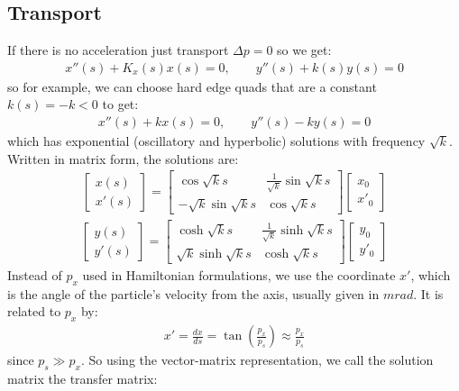 \documentclass{article}
\numberwithin{equation}{section}
\begin{document}
\subsection{ Transport }
If there is no acceleration just transport $\Delta p = 0$ so we get:
\begin{align}
x''(s) + K_x(s) x(s) = 0 , \qquad
y''(s) + k(s) y(s) = 0
\end{align}
so for example, we can choose hard edge quads that are a constant $k(s) = -k < 0$ to get: 
\begin{align}
x''(s) + k x(s) = 0 , \qquad
y''(s) - k y(s) = 0
\end{align}
which has exponential (oscillatory and hyperbolic) solutions with frequency $\sqrt{k}$. Written in matrix form, the solutions are:
\begin{align}
\begin{bmatrix} x(s) \\ x'(s) \end{bmatrix} =
\begin{bmatrix} \cos \sqrt{k}s & \frac{1}{\sqrt{k}} \sin \sqrt{k}s \\
-\sqrt{k} \sin \sqrt{k}s & \cos \sqrt{k}s \end{bmatrix}
\begin{bmatrix} x_0 \\ x'_0 \end{bmatrix}
\end{align}
\begin{align}
\begin{bmatrix} y(s) \\ y'(s) \end{bmatrix} =
\begin{bmatrix} \cosh \sqrt{k}s & \frac{1}{\sqrt{k}} \sinh \sqrt{k}s \\
\sqrt{k} \sinh \sqrt{k}s & \cosh \sqrt{k}s \end{bmatrix}
\begin{bmatrix} y_0 \\ y'_0 \end{bmatrix}
\end{align}
Instead of $p_x$ used in Hamiltonian formulations, we use the coordinate $x'$, which is the angle of the particle's velocity from the axis, usually given in $\si{mrad}$. It is related to $p_x$ by:
\begin{align}
x' = \frac{dx}{ds} = \tan \left( \frac{p_x}{p_s} \right) \approx \frac{p_x}{p_s}
\end{align}
since $p_s \gg p_x$. So using the vector-matrix representation, we call the solution matrix the transfer matrix:
\end{document}
